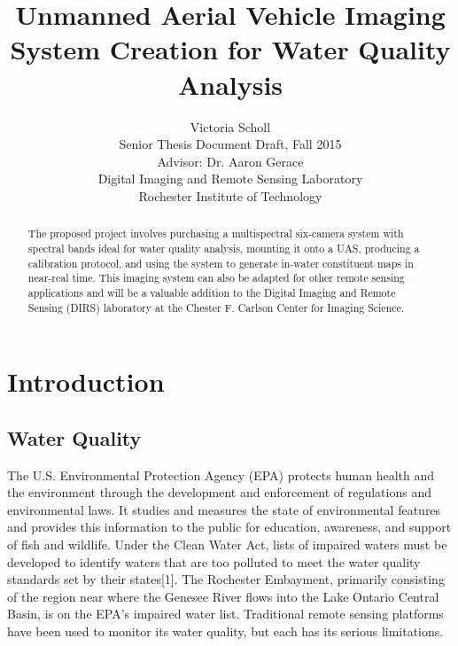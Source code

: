 \documentclass[12pt, letterpaper, oneside, onecolumn]{article}
\begin{document}
\title{Unmanned Aerial Vehicle Imaging System Creation
for Water Quality Analysis}
\author{Victoria Scholl \\ 
\vspace{0.5cm}
Senior Thesis Document Draft, Fall 2015 \\ 
Advisor: Dr. Aaron Gerace \\ 
Digital Imaging and Remote Sensing Laboratory \\ 
Rochester Institute of Technology}
\maketitle

\begin{abstract}
The proposed project involves purchasing a multispectral six-camera system with spectral bands ideal for water quality analysis, mounting it onto a UAS, producing a calibration protocol, and using the system to generate in-water constituent maps in near-real time. This imaging system can also be adapted for other remote sensing applications and will be a valuable addition to the Digital Imaging and Remote Sensing (DIRS) laboratory at the Chester F. Carlson Center for Imaging Science.
\end{abstract}

\section{Introduction}

\subsection{Water Quality}
The U.S. Environmental Protection Agency (EPA) protects human health and the environment through the development and enforcement of regulations and environmental laws. It studies and measures the state of environmental features and provides this information to the public for education, awareness, and support of fish and wildlife. Under the Clean Water Act, lists of impaired waters must be developed to identify waters that are too polluted to meet the water quality standards set by their states[1]. The Rochester Embayment, primarily consisting of the region near where the Genesee River flows into the Lake Ontario Central Basin, is on the EPA’s impaired water list. Traditional remote sensing platforms have been used to monitor its water quality, but each has its serious limitations.
\end{document}
